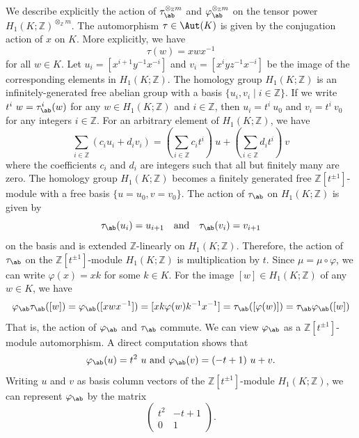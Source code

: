 \documentclass{amsart}
\begin{document}
We describe explicitly the action of $\tau_{\ab}^{\otimes_\mathbb{Z}m}$ and $\varphi_{\ab}^{\otimes_\mathbb{Z}m}$ on the tensor power $H_1(K;\mathbb{Z})^{\otimes_{\mathbb{Z}} m}$. The automorphism $\tau \in \Aut(K)$ is given by the conjugation action of $x$ on $K$. More explicitly, we have 
\[\tau(w) = xwx^{-1}\] 
for all $w \in K.$ Let $u_i = [x^{i+1}y^{-1}x^{-i}]$ and $v_i = [x^{i}yz^{-1}x^{-i}]$ be the image of the corresponding elements in $H_1(K;\mathbb{Z})$. The homology group $H_1(K;\mathbb{Z})$ is an infinitely-generated free abelian group with a basis $\{u_i,v_i\mid i \in \mathbb{Z}\}$. If we write $t^i \ w =\tau^i_{\ab}(w)$ for any $w \in H_1(K;\mathbb{Z})$ and $i \in \mathbb{Z}$, then $u_i = t^i \  u_0 $ and $v_i = t^i \ v_0$ for any integers $ i\in \mathbb{Z}$. For an arbitrary element of $H_1(K;\mathbb{Z})$, we have
\begin{equation}
    \sum_{i\in\mathbb{Z}} (c_i u_i + d_i v_i)  = \left(\sum_{i\in\mathbb{Z}}c_i t^i\right) \ u + \left(\sum_{i\in\mathbb{Z}}d_i t^i\right) \ v
\end{equation}
where the coefficients $c_i$ and $d_i$ are integers such that all but finitely many are zero. The homology group $H_1(K;\mathbb{Z})$ becomes a finitely generated free $\mathbb{Z}[t^{\pm 1}]$-module with a free basis $\{u  = u_0,v = v_0\}$. The action of $\tau_{\ab}$ on $H_1(K;\mathbb{Z})$ is given by  
\begin{equation}
    \tau_{\ab}(u_i) = u_{i+1} \quad \text{and} \quad \tau_{\ab}(v_i) = v_{i+1}
\end{equation}
on the basis and is extended $\mathbb{Z}$-linearly on $H_1(K;\mathbb{Z})$. Therefore, the action of $\tau_{\ab}$ on the $\mathbb{Z}[t^{\pm 1}]$-module $H_1(K;\mathbb{Z})$ is multiplication by $t$. Since $\mu =\mu\circ \varphi$, we can write $\varphi(x) = xk$ for some $k \in K$. For the image $[w] \in H_1(K;\mathbb{Z})$ of any $w \in K$, we have
\begin{equation}
\label{eq:CheckingVarphiAndTauCommute}
\varphi_{\ab}\tau_{\ab}([w]) = \varphi_{\ab}([xwx^{-1}]) = [xk\varphi(w)k^{-1}x^{-1}] =  \tau_{\ab}([\varphi(w)])=\tau_{\ab}\varphi_{\ab}([w])  
\end{equation}
That is, the action of $\varphi_{\ab}$ and $\tau_{\ab}$ commute. We can view $\varphi_{\ab}$ as a $\mathbb{Z}[t^{\pm 1}]$-module automorphism. A direct computation shows that
\[ 
\varphi_{\ab}(u) = t^2 \ u \text{ and }\varphi_{\ab}(v) = (-t+1) \ u + v .
\]
Writing $u$ and $v$ as basis column vectors of the $\mathbb{Z}[t^{\pm 1}]$-module $H_1(K;\mathbb{Z})$, we can represent $\varphi_{\ab}$ by the matrix
\[
\begin{pmatrix}
    t^2 & -t + 1 \\ 0 & 1 
\end{pmatrix}.
\]
\end{document}
